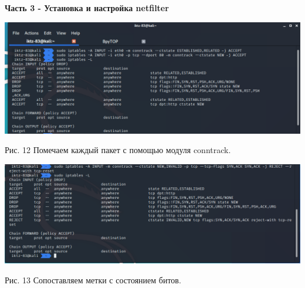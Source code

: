 \documentclass[a4paper,14pt]{extarticle}
\begin{document}
   \textbf{Часть 3 - Установка и настройка netfilter}
   \begin{center}
       
        \includegraphics[scale=0.45]{pics/12.png}

        Рис. 12 Помечаем каждый пакет с помощью модуля conntrack.
        \vspace{1ex}

        \includegraphics[scale=0.45]{pics/13.png}

        Рис. 13 Сопоставляем метки с состоянием битов.
        \vspace{1ex}

   \end{center}
\end{document}
